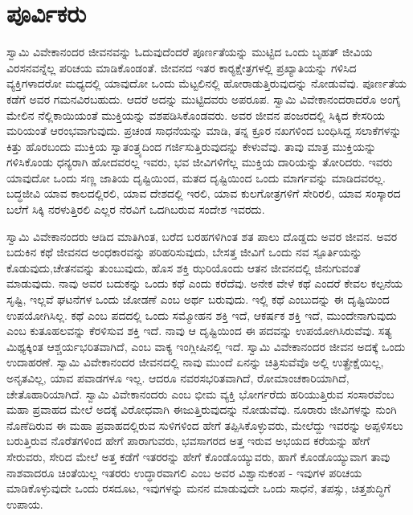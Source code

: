 
\chapter{ಪೂರ್ವಿಕರು }

ಸ್ವಾಮಿ ವಿವೇಕಾನಂದರ ಜೀವನವನ್ನು ಓದುವುದೆಂದರೆ ಪೂರ್ಣತೆಯನ್ನು ಮುಟ್ಟಿದ ಒಂದು ಬೃಹತ್ ಜೀವಿಯ ವಿರಸನವನ್ನೆಲ್ಲ ಪರಿಚಯ ಮಾಡಿಕೊಂಡಂತೆ. ಜೀವನದ ಇತರ ಕಾರ‍್ಯಕ್ಷೇತ್ರಗಳಲ್ಲಿ ಪ್ರಖ್ಯಾತಿಯನ್ನು ಗಳಿಸಿದ ವ್ಯಕ್ತಿಗಳಾದರೋ ಮಧ್ಯದಲ್ಲಿ ಯಾವುದೋ ಒಂದು ಮೆಟ್ಟಲಿನಲ್ಲಿ ಹೋರಾಡುತ್ತಿರುವುದನ್ನು ನೋಡುವೆವು. ಪೂರ್ಣತೆಯ ಕಡೆಗೆ ಅವರ ಗಮನವಿರಬಹುದು. ಆದರೆ ಅದನ್ನು ಮುಟ್ಟಿದವರು ಅಪರೂಪ. ಸ್ವಾಮಿ ವಿವೇಕಾನಂದರಾದರೊ ಅಂಗೈ ಮೇಲಿನ ನೆಲ್ಲಿಕಾಯಿಯಂತೆ ಮುಕ್ತಿಯನ್ನು ವಶಪಡಿಸಿಕೊಂಡವರು. ಅವರ ಜೀವನ ಪಂಜರದಲ್ಲಿ ಸಿಕ್ಕಿದ ಕೇಸರಿಯ ಮರಿಯಂತೆ ಆರಂಭವಾಗುವುದು. ಪ್ರಚಂಡ ಸಾಧನೆಯನ್ನು ಮಾಡಿ, ತನ್ನ ಕ್ರೂರ ನಖಗಳಿಂದ ಬಂಧಿಸಿದ್ದ ಸಲಾಕೆಗಳನ್ನು ಕಿತ್ತು ಹೊರಬಂದು ಮುಕ್ತಿಯ ಸ್ವಾತಂತ್ರ್ಯದಿಂದ ಗರ್ಜಿಸುತ್ತಿರುವುದನ್ನು ಕೇಳುವೆವು. ತಾವು ಮಾತ್ರ ಮುಕ್ತಿಯನ್ನು ಗಳಿಸಿಕೊಂಡು ಧನ್ಯರಾಗಿ ಹೋದವರಲ್ಲ ಇವರು, ಭವ ಜೀವಿಗಳಿಗೆಲ್ಲ ಮುಕ್ತಿಯ ದಾರಿಯನ್ನು ತೋರಿದರು. ಇವರು ಯಾವುದೋ ಒಂದು ಸಣ್ಣ ಜಾತಿಯ ದೃಷ್ಟಿಯಿಂದ, ಮತದ ದೃಷ್ಟಿಯಿಂದ ಒಂದು ಮಾರ್ಗವನ್ನು ಮಾಡಿದವರಲ್ಲ. ಬದ್ಧಜೀವಿ ಯಾವ ಕಾಲದಲ್ಲಿರಲಿ, ಯಾವ ದೇಶದಲ್ಲಿ ಇರಲಿ, ಯಾವ ಕುಲಗೋತ್ರಗಳಿಗೆ ಸೇರಿರಲಿ, ಯಾವ ಸಂಸ್ಕಾರದ ಬಲೆಗೆ ಸಿಕ್ಕಿ ನರಳುತ್ತಿರಲಿ ಎಲ್ಲರ ನೆರವಿಗೆ ಒದಗಿಬರುವ ಸಂದೇಶ ಇವರದು.

ಸ್ವಾಮಿ ವಿವೇಕಾನಂದರು ಆಡಿದ ಮಾತಿಗಿಂತ, ಬರೆದ ಬರಹಗಳಿಗಿಂತ ಶತ ಪಾಲು ದೊಡ್ಡದು ಅವರ ಜೀವನ. ಅವರ ಬದುಕಿನ ಕಥೆ ಜೀವನದ ಅಂಧಕಾರವನ್ನು ಪರಿಹರಿಸುವುದು, ಬೇಸತ್ತ ಜೀವಿಗೆ ಒಂದು ನವ ಸ್ಪೂರ್ತಿಯನ್ನು ಕೊಡುವುದು,ಚೇತನವನ್ನು ತುಂಬುವುದು, ಹೊಸ ಶಕ್ತಿ ಝರಿಯೊಂದು ಆತನ ಜೀವನದಲ್ಲಿ ಜಿನುಗುವಂತೆ ಮಾಡುವುದು. ನಾವು ಅವರ ಬದುಕನ್ನು ಒಂದು ಕಥೆ ಎಂದು ಕರೆದೆವು. ಅನೇಕ ವೇಳೆ ಕಥೆ ಎಂದರೆ ಕೇವಲ ಕಲ್ಪನೆಯ ಸೃಷ್ಟಿ, ಇಲ್ಲವೆ ಘಟನೆಗಳ ಒಂದು ಜೋಡಣೆ ಎಂಬ ಅರ್ಥ ಬರುವುದು. ಇಲ್ಲಿ ಕಥೆ ಎಂಬುದನ್ನು ಈ ದೃಷ್ಟಿಯಿಂದ ಉಪಯೋಗಿಸಿಲ್ಲ. ಕಥೆ ಎಂಬ ಪದದಲ್ಲಿ ಒಂದು ಸಮ್ಮೋಹನ ಶಕ್ತಿ ಇದೆ, ಆಕರ್ಷಕ ಶಕ್ತಿ ಇದೆ, ಮುಂದೇನಾಗುವುದು ಎಂಬ ಕುತೂಹಲವನ್ನು ಕೆರಳಿಸುವ ಶಕ್ತಿ ಇದೆ. ನಾವು ಆ ದೃಷ್ಟಿಯಿಂದ ಈ ಪದವನ್ನು ಉಪಯೋಗಿಸಿರುವೆವು. ಸತ್ಯ ಮಿಥ್ಯಕ್ಕಿಂತ ಆಶ್ಚರ್ಯಭರಿತವಾಗಿದೆ, ಎಂಬ ವಾಕ್ಯ ಇಂಗ್ಲೀಷಿನಲ್ಲಿ ಇದೆ. ಸ್ವಾಮಿ ವಿವೇಕಾನಂದರ ಜೀವನ ಅದಕ್ಕೆ ಒಂದು ಉದಾಹರಣೆ. ಸ್ವಾಮಿ ವಿವೇಕಾನಂದರ ಜೀವನದಲ್ಲಿ ನಾವು ಮುಂದೆ ಏನನ್ನು ಚಿತ್ರಿಸುವೆವೊ ಅಲ್ಲಿ ಉತ್ಪ್ರೇಕ್ಷೆಯಿಲ್ಲ, ಅನೃತವಿಲ್ಲ, ಯಾವ ಪವಾಡಗಳೂ ಇಲ್ಲ. ಆದರೂ ನವರಸಭರಿತವಾಗಿದೆ, ರೋಮಾಂಚಕಾರಿಯಾಗಿದೆ, ಚೇತೊಹಾರಿಯಾಗಿದೆ. ಸ್ವಾಮಿ ವಿವೇಕಾನಂದರು ಎಂಬ ಭೀಮ ವ್ಯಕ್ತಿ ಭೋರ್ಗರೆದು ಹರಿಯುತ್ತಿರುವ ಸಂಸಾರವೆಂಬ ಮಹಾ ಪ್ರವಾಹದ ಮೇಲೆ ಅದಕ್ಕೆ ವಿರೋಧವಾಗಿ ಈಜುತ್ತಿರುವುದನ್ನು ನೋಡುವೆವು. ನೂರಾರು ಜೀವಿಗಳನ್ನು ನುಂಗಿ ನೊಣೆದಿರುವ ಈ ಮಹಾ ಪ್ರವಾಹದಲ್ಲಿರುವ ಸುಳಿಗಳಿಂದ ಹೇಗೆ ತಪ್ಪಿಸಿಕೊಳ್ಳುವರು, ಮೇಲೆದ್ದು ಇವರನ್ನು ಅಪ್ಪಳಿಸಲು ಬರುತ್ತಿರುವ ನೊರೆತಗಳಿಂದ ಹೇಗೆ ಪಾರಾಗುವರು, ಭವಸಾಗರದ ಅತ್ತ ಇರುವ ಅಭಯದ ಕರೆಯನ್ನು ಹೇಗೆ ಸೇರುವರು, ಸೇರಿದ ಮೇಲೆ ಅತ್ತ ಕಡೆಗೆ ಇತರರನ್ನು ಹೇಗೆ ಕೊಂಡೊಯ್ಯುವರು, ಹಾಗೆ ಕೊಂಡೊಯ್ಯುವಾಗ ತಾವು ನಾಶವಾದರೂ ಚಿಂತೆಯಿಲ್ಲ ಇತರರು ಉದ್ಧಾರವಾಗಲಿ ಎಂಬ ಅವರ ವಿಶ್ವಾನುಕಂಪ - ಇವುಗಳ ಪರಿಚಯ ಮಾಡಿಕೊಳ್ಳುವುದೇ ಒಂದು ರಸದೂಟ, ಇವುಗಳನ್ನು ಮನನ ಮಾಡುವುದೇ ಒಂದು ಸಾಧನೆ, ತಪಸ್ಸು, ಚಿತ್ತಶುದ್ಧಿಗೆ ಉಪಾಯ. 

